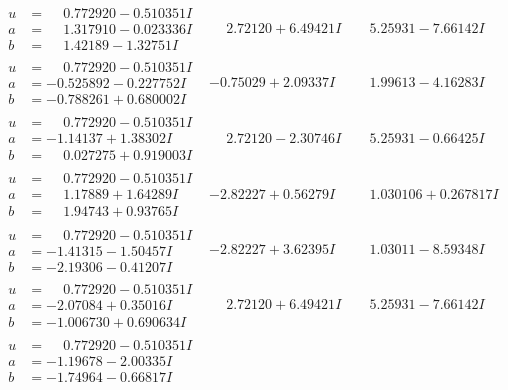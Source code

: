 \documentclass[1p]{elsarticle_modified}
\theoremstyle{definition}
\begin{document}
$$\begin{array}{c|c|c}
\begin{aligned}
u &= \phantom{-}0.772920 - 0.510351 I \\
a &= \phantom{-}1.317910 - 0.023336 I \\
b &= \phantom{-}1.42189 - 1.32751 I\end{aligned}
 & \phantom{-}2.72120 + 6.49421 I & \phantom{-}5.25931 - 7.66142 I \\ \hline\begin{aligned}
u &= \phantom{-}0.772920 - 0.510351 I \\
a &= -0.525892 - 0.227752 I \\
b &= -0.788261 + 0.680002 I\end{aligned}
 & -0.75029 + 2.09337 I & \phantom{-}1.99613 - 4.16283 I \\ \hline\begin{aligned}
u &= \phantom{-}0.772920 - 0.510351 I \\
a &= -1.14137 + 1.38302 I \\
b &= \phantom{-}0.027275 + 0.919003 I\end{aligned}
 & \phantom{-}2.72120 - 2.30746 I & \phantom{-}5.25931 - 0.66425 I \\ \hline\begin{aligned}
u &= \phantom{-}0.772920 - 0.510351 I \\
a &= \phantom{-}1.17889 + 1.64289 I \\
b &= \phantom{-}1.94743 + 0.93765 I\end{aligned}
 & -2.82227 + 0.56279 I & \phantom{-}1.030106 + 0.267817 I \\ \hline\begin{aligned}
u &= \phantom{-}0.772920 - 0.510351 I \\
a &= -1.41315 - 1.50457 I \\
b &= -2.19306 - 0.41207 I\end{aligned}
 & -2.82227 + 3.62395 I & \phantom{-}1.03011 - 8.59348 I \\ \hline\begin{aligned}
u &= \phantom{-}0.772920 - 0.510351 I \\
a &= -2.07084 + 0.35016 I \\
b &= -1.006730 + 0.690634 I\end{aligned}
 & \phantom{-}2.72120 + 6.49421 I & \phantom{-}5.25931 - 7.66142 I \\ \hline\begin{aligned}
u &= \phantom{-}0.772920 - 0.510351 I \\
a &= -1.19678 - 2.00335 I \\
b &= -1.74964 - 0.66817 I\end{aligned}

\end{array}$$
\end{document}
